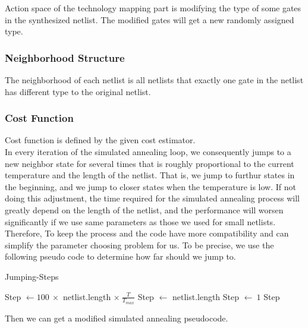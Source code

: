 \documentclass[conference]{IEEEtran}
\begin{document}
Action space of the technology mapping part is modifying the type of some gates in the synthesized netlist. The modified gates will get a new randomly assigned type.

\subsubsection{Neighborhood Structure}

The neighborhood of each netlist is all netlists that exactly one gate in the netlist has different type to the original netlist.

\subsubsection{Cost Function}

Cost function is defined by the given cost estimator.\\

In every iteration of the simulated annealing loop, we consequently jumps to a new neighbor state for several times that is roughly proportional to the current temperature and the length of the netlist. That is, we jump to furthur states in the beginning, and we jump to closer states when the temperature is low. If not doing this adjustment, the time required for the simulated annealing process will greatly depend on the length of the netlist, and the performance will worsen significantly if we use same parameters as those we used for small netlists. Therefore, To keep the process and the code have more compatibility and can simplify the parameter choosing problem for us. To be precise, we use the following pseudo code to determine how far should we jump to.
\begin{algorithm}
\begin{algorithmic}[1]
    \caption{Jumping-Steps}\label{euclid}
    \State Step $\gets 100\ \times $ netlist.length $\times\ \frac{T}{T_{max}}$ 
        \State Step $\gets$ netlist.length
        \State Step $\gets \ 1$
    \EndIf
    \State \Return Step
\end{algorithmic}
\end{algorithm}

Then we can get a modified simulated annealing pseudocode.
\end{document}
